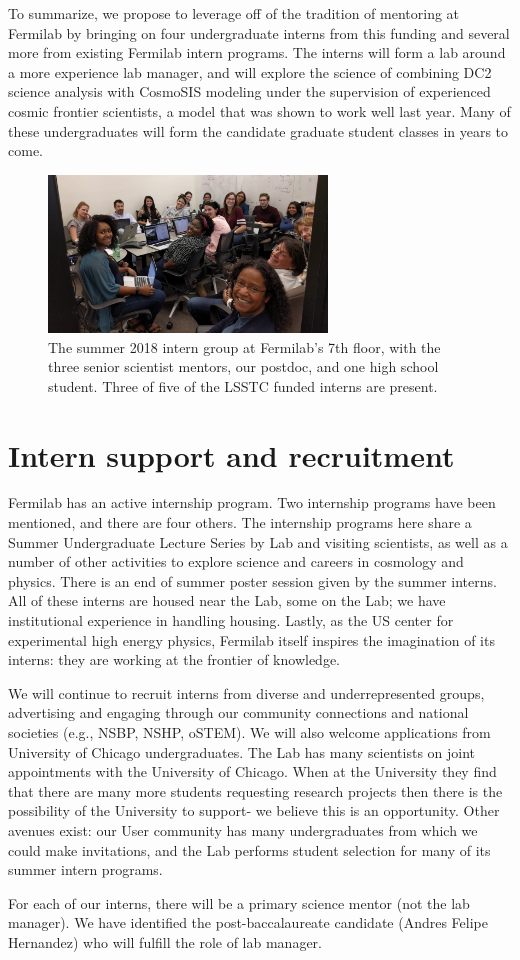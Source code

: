 To summarize, we  propose to leverage off of the tradition 
of mentoring at Fermilab by
bringing on four undergraduate interns from this funding
and several more from existing Fermilab intern programs.
The interns will form a lab around a more experience
lab manager, and will explore the science
of combining DC2 science analysis with CosmoSIS modeling
under the supervision of experienced cosmic
frontier scientists, a model that was shown to work
well last year. Many of these  undergraduates will
form the candidate graduate student classes in years to come.

\begin{figure}
  \centering
    \includegraphics[width=0.66\textwidth]{interns.png}
  \caption*{The summer 2018 intern group at Fermilab's 7th floor, with the 
three senior scientist mentors, our postdoc, and one high school student. 
Three of five of the LSSTC funded interns are present.}
\end{figure}

\newpage
\section{Intern support and recruitment}

Fermilab has an active internship program. Two internship programs
have been mentioned, and there are four others. The internship
programs here share a Summer Undergraduate Lecture Series by
Lab and visiting scientists, as well as a number of other activities to explore science and careers in cosmology and physics. There is an end of summer poster
session given by the summer interns. All of these interns
are housed near the Lab, some on the Lab; we have institutional
experience in handling housing. Lastly, as the US center for
experimental high energy physics, Fermilab itself inspires
the imagination of its interns: they are working at the frontier
of knowledge.

We will continue to recruit interns from diverse and underrepresented groups, 
advertising and engaging through our community connections and national societies (e.g., NSBP, NSHP, oSTEM). 
We will also welcome applications from University of Chicago undergraduates. 
The Lab has many scientists on joint appointments with
the University of Chicago. When at the University they find
that there are  many more students
requesting research projects then there is the possibility of
the University to support- we believe this is an opportunity.
Other avenues exist: our User community has many undergraduates
from which we could make invitations, 
and the Lab performs student selection for many of its summer
intern programs.

For each of our interns, there will be a primary science mentor (not the lab manager). 
We have identified the post-baccalaureate candidate (Andres Felipe Hernandez) who will fulfill the role of lab manager.



